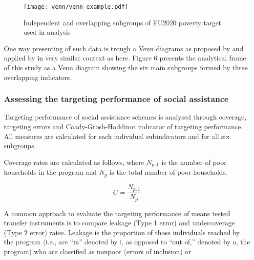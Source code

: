 \documentclass[11pt, a4paper]{article}\usepackage{graphicx, color}
\begin{document}
\begin{figure}[H]
  \centering
    \texttt{[image: venn/venn\_example.pdf]}
      \caption{Independent and overlapping subgroups of EU2020 poverty target used in analysis}
\end{figure}

One way presenting of such data is trough a Venn diagrams as proposed by \citet{ferreira_multidimensional_2012} and applied by \citet[p. 127]{atkinson_income_2010} in very similar context as here. Figure 6 presents the analytical frame of this study as a Venn diagram showing the six main subgroups formed by three overlapping indicators. 

\subsubsection*{Assessing the targeting performance of social assistance}

Targeting performance of social assistance schemes is analysed through coverage, targeting errors and Coady-Grosh-Hoddinot indicator of targeting performance. All measures are calculated for each individual subindicators and for all six subgroups.

Coverage rates are calculated as follows, where $N_{p,1}$ is the number of poor households in the program and $N_p$ is the total number of poor households.

\begin{equation}
C = \frac{N_{p,1}}{N_p}
\end{equation}


A common approach to evaluate the targeting performance of means tested transfer instruments is to compare leakage (Type 1 error) and undercoverage (Type 2 error) rates. Leakage is the proportion of those individuals reached by the program (i.e., are “in” denoted by i, as opposed to “out of,” denoted by o, the program) who are classified as nonpoor (errors of inclusion) or 
\end{document}
